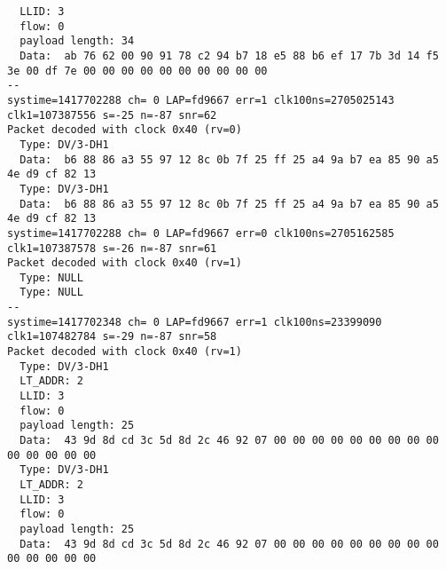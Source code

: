 \begin{verbatim}
  LLID: 3
  flow: 0
  payload length: 34
  Data:  ab 76 62 00 90 91 78 c2 94 b7 18 e5 88 b6 ef 17 7b 3d 14 f5 3e 00 df 7e 00 00 00 00 00 00 00 00 00 00
--
systime=1417702288 ch= 0 LAP=fd9667 err=1 clk100ns=2705025143 clk1=107387556 s=-25 n=-87 snr=62
Packet decoded with clock 0x40 (rv=0)
  Type: DV/3-DH1
  Data:  b6 88 86 a3 55 97 12 8c 0b 7f 25 ff 25 a4 9a b7 ea 85 90 a5 4e d9 cf 82 13
  Type: DV/3-DH1
  Data:  b6 88 86 a3 55 97 12 8c 0b 7f 25 ff 25 a4 9a b7 ea 85 90 a5 4e d9 cf 82 13
systime=1417702288 ch= 0 LAP=fd9667 err=0 clk100ns=2705162585 clk1=107387578 s=-26 n=-87 snr=61
Packet decoded with clock 0x40 (rv=1)
  Type: NULL
  Type: NULL
--
systime=1417702348 ch= 0 LAP=fd9667 err=1 clk100ns=23399090 clk1=107482784 s=-29 n=-87 snr=58
Packet decoded with clock 0x40 (rv=1)
  Type: DV/3-DH1
  LT_ADDR: 2
  LLID: 3
  flow: 0
  payload length: 25
  Data:  43 9d 8d cd 3c 5d 8d 2c 46 92 07 00 00 00 00 00 00 00 00 00 00 00 00 00 00
  Type: DV/3-DH1
  LT_ADDR: 2
  LLID: 3
  flow: 0
  payload length: 25
  Data:  43 9d 8d cd 3c 5d 8d 2c 46 92 07 00 00 00 00 00 00 00 00 00 00 00 00 00 00
\end{verbatim}